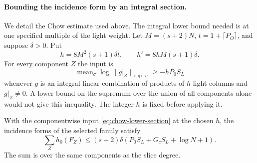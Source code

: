 \paragraph{Bounding the incidence form by an integral section.}
We detail the Chow estimate used above. The integral lower bound
needed is at one specified multiple of the light weight. Let
\(M=(s+2)N\), \(t=1+\lceil P_O\rceil\), and suppose \(\delta>0\).
Put
\[
 h=8M^2(s+1)\delta t,\qquad h'=8hM(s+1)\delta .
\]
For every component \(Z\) the input is
\begin{equation}\label{eq:chow-lower-section}
 \operatorname{mean}_{\sigma}\log\|g|_Z\|_{\sup,\sigma}
                    \ge-h P_0 S_L
\end{equation}
whenever \(g\) is an integral linear combination of products
of \(h\) light columns and \(g|_Z\ne0\). A lower bound on the
supremum over the union of all components alone would not
give this inequality. The integer \(h\) is fixed before applying it.

\begin{proposition}
\label{prop:integral-chow-bound}
With the componentwise input \eqref{eq:chow-lower-section} at the
chosen \(h\), the incidence forms of the selected family satisfy
\[
 \sum_Z h_0(F_Z)
 \le(s+2)\delta(P_0 S_L+G_c S_L+\log N+1).
\]
The sum is over the same components as the slice degree.
\end{proposition}

